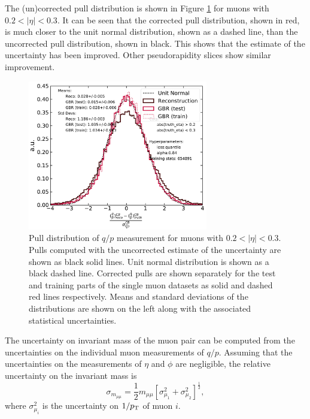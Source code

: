 The (un)corrected pull distribution is shown in Figure \ref{fig:muon:std-single}
for muons with $0.2 < |\eta| < 0.3$.
It can be seen that the corrected pull distribution, shown in red, is much closer
to the unit normal distribution, shown as a dashed line, than the uncorrected
pull distribution, shown in black. This shows that the estimate of the
uncertainty has been improved. Other pseudorapidity slices show similar improvement.
\begin{figure}[h!]
  \centering
  \includegraphics[width=0.7\textwidth]{figures/muons/vader-std-single}
  \caption[VADER4$\mu$ uncertainty correction on the single muon dataset]
  {Pull distribution of $q/p$ measurement for muons with $0.2 < |\eta| < 0.3$.
  Pulls computed with the uncorrected estimate of the uncertainty are shown
  as black solid lines. Unit normal distribution is shown as a black dashed
  line. Corrected pulls are shown separately for the test and training parts
  of the single muon datasets as solid and dashed red lines respectively.
  Means and standard deviations of the distributions are shown on the left
  along with the associated statistical uncertainties.
  }
  \label{fig:muon:std-single}
\end{figure}

The uncertainty on invariant mass of the muon pair can be computed from the 
uncertainties on the individual muon measurements of $q/p$. Assuming that the
uncertainties on the measurements of $\eta$ and $\phi$ are negligible, the
relative uncertainty on the invariant mass is
\begin{equation}
\sigma_{m_{\mu\mu}} = \frac{1}{2}m_{\mu\mu}
\left[ \sigma^2_{\mu_1} + \sigma^2_{\mu_2}\right]^\frac{1}{2},
\end{equation}
where $\sigma^2_{\mu_i}$ is the uncertainty on $1/p_{\text{T}}$ of muon $i$.

